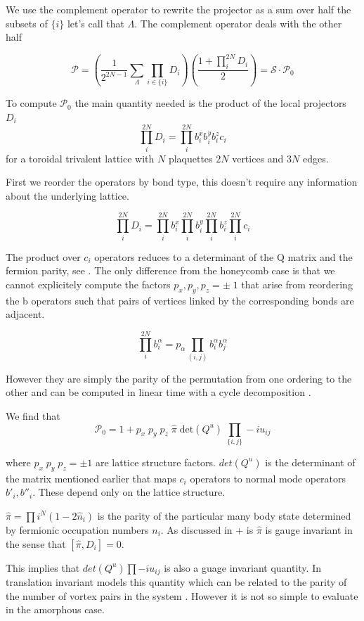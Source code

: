 We use the complement operator to rewrite the projector as a sum over
half the subsets of \(\{i\}\) let's call that \(\Lambda\). The
complement operator deals with the other half

\[ \mathcal{P} =  \left( \frac{1}{2^{2N-1}} \sum_{\Lambda} \prod_{i\in\{i\}} D_i\right) \left(\frac{1 + \prod_i^{2N} D_i}{2}\right) = \mathcal{S} \cdot \mathcal{P}_0\]

To compute \(\mathcal{P}_0\) the main quantity needed is the product of
the local projectors \(D_i\)
\[\prod_i^{2N} D_i = \prod_i^{2N} b^x_i b^y_i b^z_i c_i \] for a
toroidal trivalent lattice with \(N\) plaquettes \(2N\) vertices and
\(3N\) edges.

First we reorder the operators by bond type, this doesn't require any
information about the underlying lattice.

\[\prod_i^{2N} D_i = \prod_i^{2N} b^x_i \prod_i^{2N} b^y_i \prod_i^{2N} b^z_i \prod_i^{2N} c_i\]

The product over \(c_i\) operators reduces to a determinant of the Q
matrix and the fermion parity, see
\textcite{pedrocchiPhysicalSolutionsKitaev2011b}. The only difference
from the honeycomb case is that we cannot explicitely compute the
factors \(p_x,p_y,p_z = \pm\;1\) that arise from reordering the b
operators such that pairs of vertices linked by the corresponding bonds
are adjacent.

\[\prod_i^{2N} b^\alpha_i = p_\alpha \prod_{(i,j)}b^\alpha_i b^\alpha_j\]

However they are simply the parity of the permutation from one ordering
to the other and can be computed in linear time with a cycle
decomposition \textcite{app:cycle_decomp}.

We find that
\[\mathcal{P}_0 = 1 + p_x\;p_y\;p_z\; \hat{\pi} \; \mathrm{det}(Q^u) \; \prod_{\{i,j\}} -iu_{ij}\]

where \(p_x\;p_y\;p_z = \pm 1\) are lattice structure factors.
\(det(Q^u)\) is the determinant of the matrix mentioned earlier that
maps \(c_i\) operators to normal mode operators \(b'_i, b''_i\). These
depend only on the lattice structure.

\(\hat{\pi} = \prod{i}^{N} (1 - 2\hat{n}_i)\) is the parity of the
particular many body state determined by fermionic occupation numbers
\(n_i\). As discussed in
+\textcite{pedrocchiPhysicalSolutionsKitaev2011b} is \(\hat{\pi}\) is
gauge invariant in the sense that \([\hat{\pi}, D_i] = 0\).

This implies that \(det(Q^u) \prod -i u_{ij}\) is also a guage invariant
quantity. In translation invariant models this quantity which can be
related to the parity of the number of vortex pairs in the system
\textcite{yaoAlgebraicSpinLiquid2009}. However it is not so simple to
evaluate in the amorphous case.


